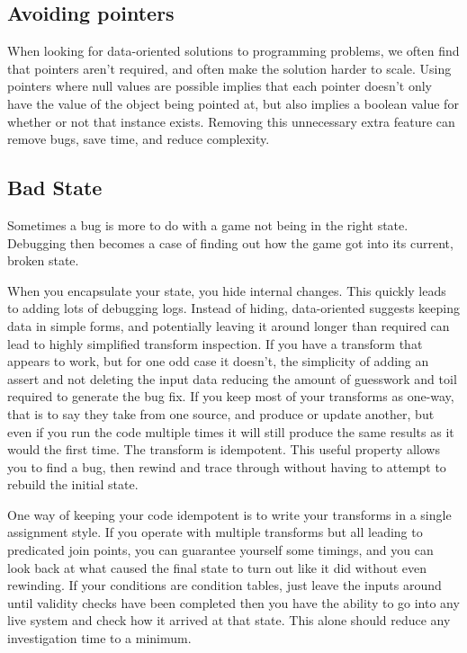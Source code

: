 \subsection{Avoiding pointers}

When looking for data-oriented solutions to programming problems, we often find
that pointers aren't required, and often make the solution harder to scale.
Using pointers where null values are possible implies that each pointer doesn't
only have the value of the object being pointed at, but also implies a boolean
value for whether or not that instance exists. Removing this unnecessary extra
feature can remove bugs, save time, and reduce complexity.

\subsection{Bad State}

Sometimes a bug is more to do with a game not being in the right state.
Debugging then becomes a case of finding out how the game got into its current,
broken state.

When you encapsulate your state, you hide internal changes. This quickly leads
to adding lots of debugging logs. Instead of hiding, data-oriented suggests
keeping data in simple forms, and potentially leaving it around longer than
required can lead to highly simplified transform inspection. If you have a
transform that appears to work, but for one odd case it doesn't, the simplicity
of adding an assert and not deleting the input data reducing the amount of
guesswork and toil required to generate the bug fix. If you keep most of your
transforms as one-way, that is to say they take from one source, and produce or
update another, but even if you run the code multiple times it will still
produce the same results as it would the first time. The transform is
idempotent. This useful property allows you to find a bug, then rewind and
trace through without having to attempt to rebuild the initial state.

One way of keeping your code idempotent is to write your transforms in a single
assignment style. If you operate with multiple transforms but all leading to
predicated join points, you can guarantee yourself some timings, and you can
look back at what caused the final state to turn out like it did without even
rewinding. If your conditions are condition tables, just leave the inputs
around until validity checks have been completed then you have the ability to
go into any live system and check how it arrived at that state. This alone
should reduce any investigation time to a minimum.

